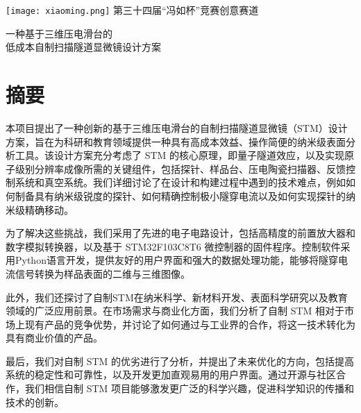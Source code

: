 \documentclass{article}
\begin{document}
\def\Fengru{第三十四届“冯如杯”竞赛创意赛道\\}
\vspace{32pt}
\begin{center}
	\texttt{[image: xiaoming.png]}
	\vskip 6pt
	\xiaoer
	\zhongsong
	第三十四届“冯如杯”竞赛创意赛道
\end{center}
\vspace{12pt}
\begin{spacing}{3}
	\begin{center} 
		\erhao
		\zhongsong
		一种基于三维压电滑台的\\低成本自制扫描隧道显微镜设计方案
	\end{center}
\end{spacing}




\renewcommand{\headrulewidth}{0pt}	%
\clearpage
{}	%


\xiaosi
\section*{摘要}
{}
\begin{spacing}{1.5}
	\setParDis %
	本项目提出了一种创新的基于三维压电滑台的自制扫描隧道显微镜（STM）设计方案，旨在为科研和教育领域提供一种具有高成本效益、操作简便的纳米级表面分析工具。该设计方案充分考虑了 STM 的核心原理，即量子隧道效应，以及实现原子级别分辨率成像所需的关键组件，包括探针、样品台、压电陶瓷扫描器、反馈控制系统和真空系统。我们详细讨论了在设计和构建过程中遇到的技术难点，例如如何制备具有纳米级锐度的探针、如何精确控制极小隧穿电流以及如何实现探针的纳米级精确移动。
	
	为了解决这些挑战，我们采用了先进的电子电路设计，包括高精度的前置放大器和数字模拟转换器，以及基于 STM32F103C8T6 微控制器的固件程序。控制软件采用Python语言开发，提供友好的用户界面和强大的数据处理功能，能够将隧穿电流信号转换为样品表面的二维与三维图像。
	
	此外，我们还探讨了自制STM在纳米科学、新材料开发、表面科学研究以及教育领域的广泛应用前景。在市场需求与商业化方面，我们分析了自制 STM 相对于市场上现有产品的竞争优势，并讨论了如何通过与工业界的合作，将这一技术转化为具有商业价值的产品。
	
	最后，我们对自制 STM 的优劣进行了分析，并提出了未来优化的方向，包括提高系统的稳定性和可靠性，以及开发更加直观易用的用户界面。通过开源与社区合作，我们相信自制 STM 项目能够激发更广泛的科学兴趣，促进科学知识的传播和技术的创新。
	
\end{spacing}
\end{document}
